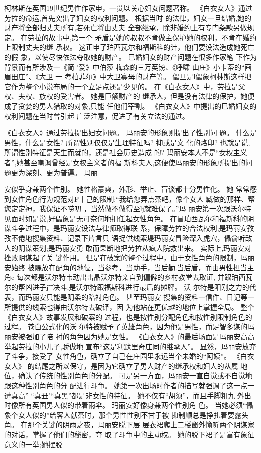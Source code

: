 \documentclass[portrait,a4paper]{article}
\begin{document}
柯林斯在英国19世纪男性作家申，一贯以关心妇女问题著称。
《白衣女人》通过劳拉的命运,首先突出了妇女的权利问题。 根据当时
的法律，妇女一旦结婚,她的财产将全部归丈夫所有,若死亡将由丈夫
全部继承，除非婚约上有专门条款另做规定。 在劳拉的故事中,第一个
矛盾是她的叔叔不肯做主保护她的权利，不肯在婚约上限制丈夫的继
承权。 这正申了珀西瓦尔和福斯科的计，他们要设法造成她死亡的假
象，以使尽快依法夺取她的财产。 巳婚妇女的财产问题在很多作家笔
下作为背景而有所涉及一《简 '爱》中伯莎-梅森的三万英镑、《呼啸
山庄》小卡蒂的“画眉田庄”、《大卫 一 考柏菲尔》中大卫寡母的财产等。
儡旦是l儡象柯林斯这样把它作为整个小说布局的一个立足点还是少见的。
在《白衣女人》中，劳拉是父权、夫权、族权的受害者。 她是巨额财产的
继承人，但是没有法律的保护，她便成了贪婪的男人猎取的对象,只能
任他们宰割。 《白衣女人》中提出的巳婚妇女的权利间题在当时曾引起
广泛注意，促进了有关立法的通过。

《白衣女人》通过劳拉提出妇女问题。 玛丽安的形象则提出了性别问
题。 什么是男性，什么是女性? 所谓性别仅仅是生理特征吗? 抑或是文
化的烙印? 也就是说,所谓性别特征是天生而就的，还是社会历史造成
的? 玛丽安本人不是“女权主义者”,她甚至嘲讽曾经是女权主义者的福
斯科夫人,这便使玛丽安的形象所提出的问题更为深刻、更为普遍。 玛丽

安似乎身兼两个性别。 她性格豪爽，外形、举止、盲谈都十分男性化。 她
常常感到女性角色行为规范对F丨己的限制:“我给您弄点茶吧，像个女人
臧做的那样、帮您定定神，我保证不唠叨ˉ，当然做不做得至lj就难保了。”玛
丽安第一次跟沃尔特见面时如是说,好儡象是无可奈何地扣任起女性角色。
在冒珀西瓦尔和福斯科的阴谋斗争过程中，是玛丽安设法与律师取得联
系，保障劳拉的合法权利;是玛丽安孜孜不倦地搜集资料、记录下片言只
语捉供线索堤玛丽安冒险深入虎穴，儡俞听敌人的阴谋策划;是玛丽安勇
敢而果断地把劳拉从疯人院救出来。 实际上,玛丽安对挫败阴谋起了关
键作用。 但是在破案的整个过程中，由于女性角色的限制，玛丽安始终
被髁放在配角的地位，当参考，当助手，当后勤.当后盾，而由男性担当主
角c 每次都是沃尔特韦动出击晶沃尔特亲自到偏僻的乡村教堂去取证,
并跟珀西瓦尔的帮凶进子jˉˉ决斗;是沃尔特跟福斯科进行最后的摊牌。 沃
尔特是阳刚之力的代表，而玛丽安只能是阴柔的陪衬角色。 甚至玛丽安
搜集的资料一信件、日记等一所提供的线索也得由沃尔特去破译，因
为他站在更优越的地位上掌握全局。 整个《白衣女人》故事发展和破案的
过程，也是按性别分配角色和按性别限制角色的过程。 苍白公式化的沃
尔特被赋予了英雄角色，因为他是男性，而足智多谋的玛丽安被强加了陪
衬的角色因为她是女性。
《白衣女人》的最后场面是玛丽安高高举起劳拉的小儿子,骄傲地
宣布“这是利默里奇庄同的继承人”。 显然，玛丽安放弃了斗争，接受了
女性角色，确立了自己在庄园里永远当个未婚的“阿姨”。 《白衣女人》
的结尾之所以保守，是因为它确立了男人财产的继承权和妇人的从属
地位，确认了传统的性别角色的分配。
可是另一方面，玛丽安一直自觉或不自觉地跟这种性别角色的分
配进行斗争。 她第一次出场时作者的描写就强调了这一点一遭真高”
“真丑"“真黑”都是非女性的特征。 她不仅有“胡须”，而且手脚粗九
外出时像所有英国男人似的带着雨伞。 玛丽安好像身兼两个性别角
色。 当她必须“儡象个女人似的”给客人献茶时，那个男性性别不甘于被
抑制顺总是挣扎着要露头角。 在那个关键的阴雨之夜，玛丽安脱下层
层衣裙爬上二楼窗外愉听两个阴谋家的对话，掌握了他们的秘密，夺
取了斗争中的主动权。 她的脱下裙子是富有象征意义的一举;她摆脱
\end{document}
